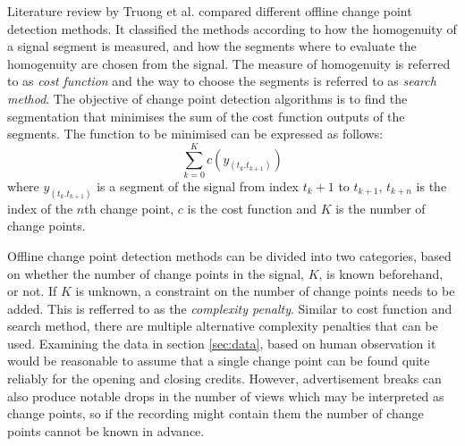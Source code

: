 Literature review by Truong et al. \cite{truongSelectiveReviewOffline2020} compared different offline change point detection methods. It classified the methods according to how the homogenuity of a signal segment is measured, and how the segments where to evaluate the homogenuity are chosen from the signal. The measure of homogenuity is referred to as \textit{cost function} and the way to choose the segments is referred to as \textit{search method}. %
The objective of change point detection algorithms %
is to find the segmentation that minimises the sum of the cost function outputs of the segments. %
The function to be minimised can be expressed as follows:
\begin{equation} %
  \sum_{k=0} ^{K}  c(y_{ (t_k . t_{k+1} )})
  \label{eq:minimise_segments}
\end{equation}
where $y_{ (t_k . t_{k+1} )}$ is a segment of the signal from index $t_k+1$ to $t_{k+1}$, $t_{k+n}$ is the index of the $n$th change point, $c$ is the cost function and $K$ is the number of change points.

Offline %
change point detection
methods can be divided into two categories, based on whether the number of change points in the signal, %
$K$, is known beforehand, or not. If $K$ %
is unknown, a constraint on the number of change points needs to be added. This is refferred to as the \textit{complexity penalty}. Similar to cost function and search method, there are multiple alternative complexity penalties that can be used.
Examining the data in section \ref{sec:data}, based on human observation it would be reasonable to assume that a single change point can be found quite reliably for the opening and closing credits. However, advertisement breaks can also produce notable drops in the number of views which may be interpreted as change points, so if the recording might contain them the number of change points cannot be known in advance.


